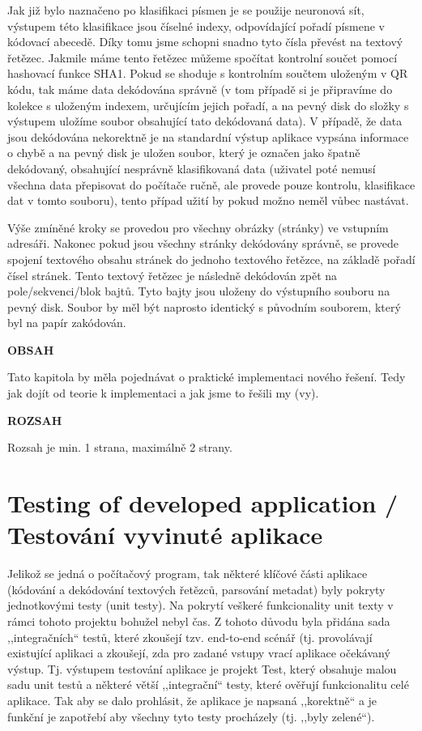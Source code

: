 \documentclass[conference]{IEEEtran}
\begin{document}
Jak již bylo naznačeno po klasifikaci písmen je se použije neuronová sít, výstupem této klasifikace jsou číselné indexy, odpovídající pořadí písmene v kódovací abecedě. Díky tomu jsme schopni snadno tyto čísla převést na textový řetězec. Jakmile máme tento řetězec můžeme spočítat kontrolní součet pomocí hashovací funkce SHA1. Pokud se shoduje s kontrolním součtem uloženým v QR kódu, tak máme data dekódována správně (v tom případě si je připravíme do kolekce s uloženým indexem, určujícím jejich pořadí, a na pevný disk do složky s výstupem uložíme soubor obsahující tato dekódovaná data). V případě, že data jsou dekódována nekorektně je na standardní výstup aplikace vypsána informace o chybě a na pevný disk je uložen soubor, který je označen jako špatně dekódovaný, obsahující nesprávně klasifikovaná data (uživatel poté nemusí všechna data přepisovat do počítače ručně, ale provede pouze kontrolu, klasifikace dat v tomto souboru), tento případ užití by pokud možno neměl vůbec nastávat.

Výše zmíněné kroky se provedou pro všechny obrázky (stránky) ve vstupním adresáři. Nakonec pokud jsou všechny stránky dekódovány správně, se provede spojení textového obsahu stránek do jednoho textového řetězce, na základě pořadí čísel stránek. Tento textový řetězec je následně dekódován zpět na pole/sekvenci/blok bajtů. Tyto bajty jsou uloženy do výstupního souboru na pevný disk. Soubor by měl být naprosto identický s původním souborem, který byl na papír zakódován.

\textbf{OBSAH}

Tato kapitola by měla pojednávat o praktické implementaci nového řešení. Tedy jak dojít od teorie k implementaci a jak jsme to řešili my (vy).

\textbf{ROZSAH}

Rozsah je min. 1 strana, maximálně 2 strany.

\section{Testing of developed application / Testování vyvinuté aplikace}

Jelikož se jedná o počítačový program, tak některé klíčové části aplikace (kódování a dekódování textových řetězců, parsování metadat) byly pokryty jednotkovými testy (unit testy). Na pokrytí veškeré funkcionality unit texty v rámci tohoto projektu bohužel nebyl čas. Z tohoto důvodu byla přidána sada ,,integračních`` testů, které zkoušejí tzv. end-to-end scénář (tj. provolávají existující aplikaci a zkoušejí, zda pro zadané vstupy vrací aplikace očekávaný výstup. Tj. výstupem testování aplikace je projekt Test, který obsahuje malou sadu unit testů a některé větší ,,integrační`` testy, které ověřují funkcionalitu celé aplikace. Tak aby se dalo prohlásit, že aplikace je napsaná ,,korektně`` a je funkční je zapotřebí aby všechny tyto testy procházely (tj. ,,byly zelené``).
\end{document}
